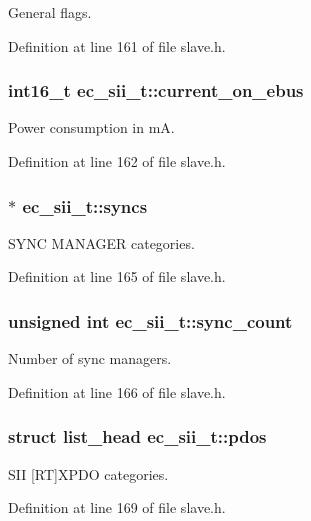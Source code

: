 General flags. 



Definition at line 161 of file slave.\-h.

\subsubsection[{current\-\_\-on\-\_\-ebus}]{\setlength{\rightskip}{0pt plus 5cm}int16\-\_\-t ec\-\_\-sii\-\_\-t\-::current\-\_\-on\-\_\-ebus}\label{structec__sii__t_a67585e573f37806a5c34923354874838}


Power consumption in m\-A. 



Definition at line 162 of file slave.\-h.

\subsubsection[{syncs}]{$\ast$ ec\-\_\-sii\-\_\-t\-::syncs}\label{structec__sii__t_a1cfcfe4bdca850f302cbb8938affa7b9}


S\-Y\-N\-C M\-A\-N\-A\-G\-E\-R categories. 



Definition at line 165 of file slave.\-h.

\subsubsection[{sync\-\_\-count}]{\setlength{\rightskip}{0pt plus 5cm}unsigned int ec\-\_\-sii\-\_\-t\-::sync\-\_\-count}\label{structec__sii__t_add5337cd03f09660a3bfe91e4047ed2c}


Number of sync managers. 



Definition at line 166 of file slave.\-h.

\subsubsection[{pdos}]{\setlength{\rightskip}{0pt plus 5cm}struct list\-\_\-head ec\-\_\-sii\-\_\-t\-::pdos}\label{structec__sii__t_a769c826981c5b3d1ee52245131537b15}


S\-I\-I [R\-T]X\-P\-D\-O categories. 



Definition at line 169 of file slave.\-h.

